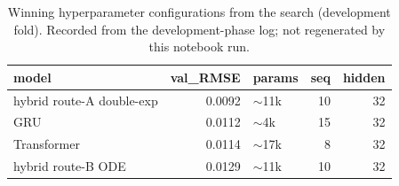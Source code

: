 \begin{table}
\caption{Winning hyperparameter configurations from the search (development fold). Recorded from the development-phase log; not regenerated by this notebook run.}
\label{tab:hpo_winning_configs}
\begin{tabular}{lrlrr}
\toprule
model & val\_RMSE & params & seq & hidden \\
\midrule
hybrid route-A double-exp & 0.0092 & $\sim$11k & 10 & 32 \\
GRU & 0.0112 & $\sim$4k & 15 & 32 \\
Transformer & 0.0114 & $\sim$17k & 8 & 32 \\
hybrid route-B ODE & 0.0129 & $\sim$11k & 10 & 32 \\
\bottomrule
\end{tabular}
\end{table}
